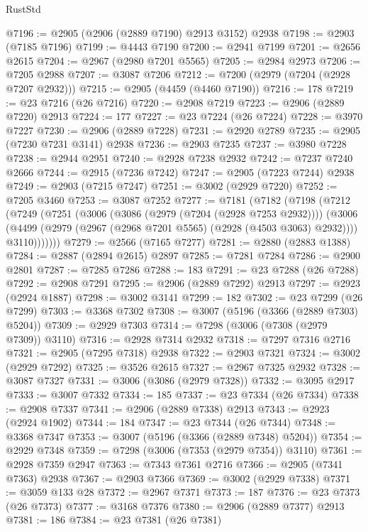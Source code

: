 \begin{lexlean}{RustStd}
\begin{coremodule}
{\begin{coremodule}
{{{{{{{{{{{{{{{{{{{{{{{{{{{{{{{{{{{{{{{{{{{{{{{{{{{{{{{{{{{{{{{{{{{{{{{{{{{{{{@7196 := @2905 (@2906 (@2889 @7190) @2913 @3152) @2938
@7198 := @2903 (@7185 @7196)
@7199 := @4443 @7190
@7200 := @2941 @7199
@7201 := @2656 @2615
@7204 := @2967 (@2980 @7201 @5565)
@7205 := @2984 @2973
@7206 := @7205 @2988
@7207 := @3087 @7206
@7212 := @7200 (@2979 (@7204 (@2928 @7207 @2932)))
@7215 := @2905 (@4459 (@4460 @7190))
@7216 := 178
@7219 := @23 @7216 (@26 @7216)
@7220 := @2908 @7219
@7223 := @2906 (@2889 @7220) @2913
@7224 := 177
@7227 := @23 @7224 (@26 @7224)
@7228 := @3970 @7227
@7230 := @2906 (@2889 @7228)
@7231 := @2920 @2789
@7235 := @2905 (@7230 @7231 @3141) @2938
@7236 := @2903 @7235
@7237 := @3980 @7228
@7238 := @2944 @2951
@7240 := @2928 @7238 @2932
@7242 := @7237 @7240 @2666
@7244 := @2915 (@7236 @7242)
@7247 := @2905 (@7223 @7244) @2938
@7249 := @2903 (@7215 @7247)
@7251 := @3002 (@2929 @7220)
@7252 := @7205 @3460
@7253 := @3087 @7252
@7277 := @7181
    (@7182
      (@7198
        (@7212
          (@7249
            (@7251
              (@3006
                (@3086 (@2979 (@7204 (@2928 @7253 @2932))))
                (@3006
                  (@4499 (@2979 (@2967 (@2968 @7201 @5565) (@2928 (@4503 @3063) @2932))))
                  @3110)))))))
@7279 := @2566 (@7165 @7277)
@7281 := @2880 (@2883 @1388)
@7284 := @2887 (@2894 @2615) @2897
@7285 := @7281 @7284
@7286 := @2900 @2801
@7287 := @7285 @7286
@7288 := 183
@7291 := @23 @7288 (@26 @7288)
@7292 := @2908 @7291
@7295 := @2906 (@2889 @7292) @2913
@7297 := @2923 (@2924 @1887)
@7298 := @3002 @3141
@7299 := 182
@7302 := @23 @7299 (@26 @7299)
@7303 := @3368 @7302
@7308 := @3007 (@5196 (@3366 (@2889 @7303) @5204))
@7309 := @2929 @7303
@7314 := @7298 (@3006 (@7308 (@2979 @7309)) @3110)
@7316 := @2928 @7314 @2932
@7318 := @7297 @7316 @2716
@7321 := @2905 (@7295 @7318) @2938
@7322 := @2903 @7321
@7324 := @3002 (@2929 @7292)
@7325 := @3526 @2615
@7327 := @2967 @7325 @2932
@7328 := @3087 @7327
@7331 := @3006 (@3086 (@2979 @7328))
@7332 := @3095 @2917
@7333 := @3007 @7332
@7334 := 185
@7337 := @23 @7334 (@26 @7334)
@7338 := @2908 @7337
@7341 := @2906 (@2889 @7338) @2913
@7343 := @2923 (@2924 @1902)
@7344 := 184
@7347 := @23 @7344 (@26 @7344)
@7348 := @3368 @7347
@7353 := @3007 (@5196 (@3366 (@2889 @7348) @5204))
@7354 := @2929 @7348
@7359 := @7298 (@3006 (@7353 (@2979 @7354)) @3110)
@7361 := @2928 @7359 @2947
@7363 := @7343 @7361 @2716
@7366 := @2905 (@7341 @7363) @2938
@7367 := @2903 @7366
@7369 := @3002 (@2929 @7338)
@7371 := @3059 @133 @28
@7372 := @2967 @7371
@7373 := 187
@7376 := @23 @7373 (@26 @7373)
@7377 := @3168 @7376
@7380 := @2906 (@2889 @7377) @2913
@7381 := 186
@7384 := @23 @7381 (@26 @7381)
}}}}}}}}}}}}}}}}}}}}}}}}}}}}}}}}}}}}}}}}}}}}}}}}}}}}}}}}}}}}}}}}}}}}}}}}}}}}}}
\end{coremodule}}
\end{coremodule}
\end{lexlean}
